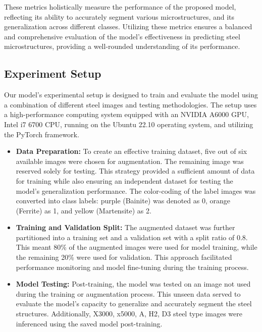 \documentclass[]{article}
\begin{document}
These metrics holistically measure the performance of the proposed model, reflecting its ability to accurately segment various microstructures, and its generalization across different classes. Utilizing these metrics ensures a balanced and comprehensive evaluation of the model's effectiveness in predicting steel microstructures, providing a well-rounded understanding of its performance.

\subsection{Experiment Setup}

Our model's experimental setup is designed to train and evaluate the model using a combination of different steel images and testing methodologies. The setup uses a high-performance computing system equipped with an NVIDIA A6000 GPU, Intel i7 6700 CPU, running on the Ubuntu 22.10 operating system, and utilizing the PyTorch framework.

\begin{itemize}
	\item \textbf{Data Preparation:} To create an effective training dataset, five out of six available images were chosen for augmentation. The remaining image was reserved solely for testing. This strategy provided a sufficient amount of data for training while also ensuring an independent dataset for testing the model's generalization performance. The color-coding of the label images was converted into class labels: purple (Bainite) was denoted as 0, orange (Ferrite) as 1, and yellow (Martensite) as 2.
	
	\item \textbf{Training and Validation Split:} The augmented dataset was further partitioned into a training set and a validation set with a split ratio of 0.8. This meant 80\% of the augmented images were used for model training, while the remaining 20\% were used for validation. This approach facilitated performance monitoring and model fine-tuning during the training process.
	
	\item \textbf{Model Testing:} Post-training, the model was tested on an image not used during the training or augmentation process. This unseen data served to evaluate the model's capacity to generalize and accurately segment the steel structures. Additionally, X3000, x5000, A, H2, D3 steel type images were inferenced using the saved model post-training.
\end{itemize}
\end{document}
